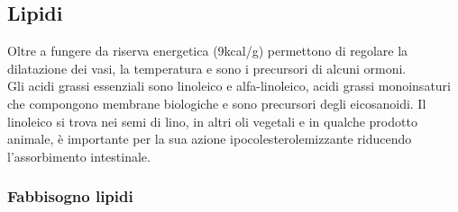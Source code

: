 \documentclass[10pt]{article}
\begin{document}
\subsection{Lipidi}
Oltre a fungere da riserva energetica (9kcal/g) permettono di regolare la dilatazione dei vasi, la temperatura e sono i precursori di alcuni ormoni.\\
Gli acidi grassi essenziali sono linoleico e alfa-linoleico, acidi grassi monoinsaturi che compongono membrane biologiche e sono precursori degli eicosanoidi. Il linoleico si trova nei semi di lino, in altri oli vegetali e in qualche prodotto animale, è importante per la sua azione ipocolesterolemizzante riducendo l'assorbimento intestinale.
\subsubsection{Fabbisogno lipidi}
\end{document}
